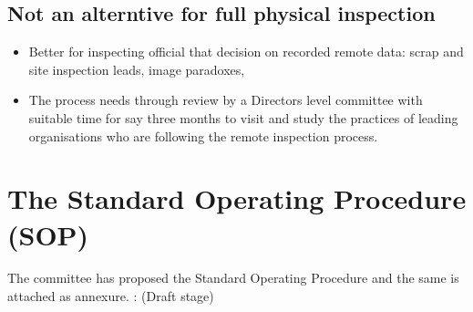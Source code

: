 \documentclass[
]{article}
\providecommand{\tightlist}{%
  \setlength{\itemsep}{0pt}\setlength{\parskip}{0pt}}
\begin{document}
\hypertarget{not-an-alterntive-for-full-physical-inspection}{%
\subsection{Not an alterntive for full physical
inspection}\label{not-an-alterntive-for-full-physical-inspection}}

\begin{itemize}
\tightlist
\item
  Better for inspecting official that decision on recorded remote data:
  scrap and site inspection leads, image paradoxes,
\item
  The process needs through review by a Directors level committee with
  suitable time for say three months to visit and study the practices of
  leading organisations who are following the remote inspection process.
\end{itemize}

\hypertarget{the-standard-operating-procedure-sop}{%
\section{The Standard Operating Procedure
(SOP)}\label{the-standard-operating-procedure-sop}}

The committee has proposed the Standard Operating Procedure and the same
is attached as annexure. : (Draft stage)
\end{document}
